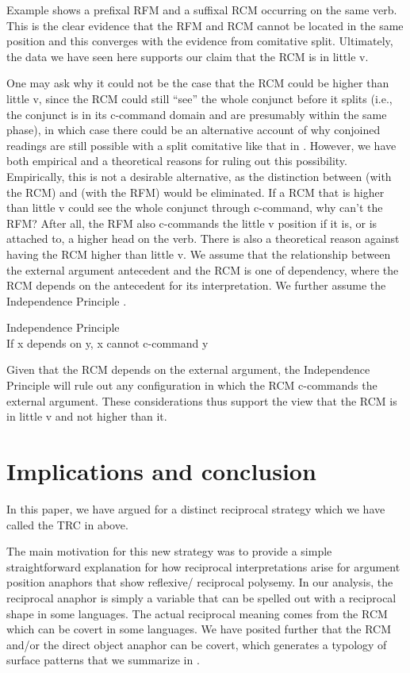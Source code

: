 \documentclass[output=paper]{langsci/langscibook}
\begin{document}
Example  shows a prefixal RFM and a suffixal RCM occurring on the same verb. This is the clear evidence that the RFM and RCM cannot be located in the same position and this converges with the evidence from comitative split. Ultimately, the data we have seen here supports our claim that the RCM is in little v. 

One may ask why it could not be the case that the RCM could be higher than little v, since the RCM could still “see” the whole conjunct before it splits (i.e., the conjunct is in its c-command domain and are presumably within the same phase), in which case there could be an alternative account of why conjoined readings are still possible with a split comitative like that in . However, we have both empirical and a theoretical reasons for ruling out this possibility. Empirically, this is not a desirable alternative, as the distinction between  (with the RCM) and  (with the RFM) would be eliminated. If a RCM that is higher than little v could see the whole conjunct through c-command, why can't the RFM? After all, the RFM also c-commands the little v position if it is, or is attached to, a higher head on the verb. There is also a theoretical reason against having the RCM higher than little v. We assume that the relationship between the external argument antecedent and the RCM is one of dependency, where the RCM depends on the antecedent for its interpretation. We further assume the Independence Principle \citep{Safir2004}. 


\ea\label{ex:safir:24}
Independence Principle \citep[3]{Safir2004}\\
  If x depends on y, x cannot c-command y
\z

Given that the RCM depends on the external argument, the Independence Principle will rule out any configuration in which the RCM c-commands the external argument. These considerations thus support the view that the RCM is in little v and not higher than it. 

\section{Implications and conclusion}\label{sec:safir:5}

In this paper, we have argued for a distinct reciprocal strategy which we have called the TRC in  above. 

The main motivation for this new strategy was to provide a simple straightforward explanation for how reciprocal interpretations arise for argument position anaphors that show reflexive/ reciprocal polysemy. In our analysis, the reciprocal anaphor is simply a variable that can be spelled out with a reciprocal shape in some languages. The actual reciprocal meaning comes from the RCM which can be covert in some languages. We have posited further that the RCM and/or the direct object anaphor can be covert, which generates a typology of surface patterns that we summarize in .
 
\end{document}
